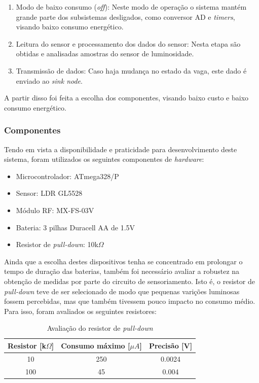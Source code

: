 \documentclass[oneside,openright,12pt]{ufsm_2015} %
\begin{document}
    \begin{enumerate}
        \item Modo de baixo consumo (\textit{off}): Neste modo de operação o sistema mantém grande parte dos subsistemas desligados, como conversor AD e \textit{timers}, visando baixo consumo energético.
        \item Leitura do sensor e processamento dos dados do sensor: Nesta etapa são obtidas e analisadas amostras do sensor de luminosidade.
        \item Transmissão de dados: Caso haja mudança no estado da vaga, este dado é enviado ao \textit{sink node}.
    \end{enumerate}
    
    A partir disso foi feita a escolha dos componentes, visando baixo custo e baixo consumo energético.
    
    \subsubsection{Componentes}
    Tendo em vista a disponibilidade e praticidade para desenvolvimento deste sistema, foram utilizados os seguintes componentes de \textit{hardware}:
    \begin{itemize}
        \item Microcontrolador: ATmega328/P
        \item Sensor: LDR GL5528 
        \item Módulo RF: MX-FS-03V
        \item Bateria: 3 pilhas Duracell AA de 1.5V
        \item Resistor de \textit{pull-down}: 10k$\Omega$
    \end{itemize}
    
    Ainda que a escolha destes dispositivos tenha se concentrado em prolongar o tempo de duração das baterias, também foi necessário avaliar a robustez na obtenção de medidas por parte do circuito de sensoriamento. Isto é, o resistor de \textit{pull-down} teve de ser selecionado de modo que pequenas varições luminosas fossem percebidas, mas que também tivessem pouco impacto no consumo médio. Para isso, foram avaliados os seguintes resistores:
    
    \begin{table}[ht]
         \centering
         \caption{Avaliação do resistor de \textit{pull-down}}
         \begin{tabular}{ c c c }
             \hline
             Resistor [k$\Omega$] & Consumo máximo [$\mu A$] & Precisão [V] \\
             \hline
             10 & 250 & 0.0024 \\
             100 & 45 & 0.004 \\
             \hline
         \end{tabular}
         \vspace{\baselineskip} %
          \label{table:pull-down}
    \end{table}
    
\end{document}
